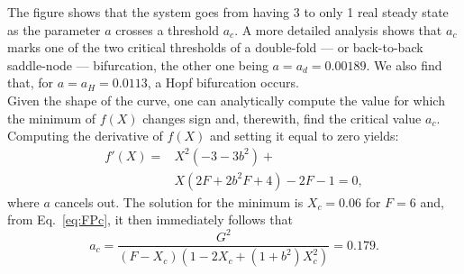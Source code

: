 \documentclass[%
 aip, cha,
 amsmath,amssymb,
 reprint,%
author-year,%
]{revtex4-1}
\newcommand{\0}{\mathbf 0}
\begin{document}
The figure shows that the system goes from having 3 to only 1 real steady state as the parameter $a$ crosses a threshold $a_c.$ 
A more detailed analysis shows that $a_c$ marks one of the two critical thresholds of a double-fold — or back-to-back saddle-node — bifurcation, the other one being $a = a_d = 0.00189$. We also find that, for $a = a_H=0.0113$, a Hopf bifurcation occurs. \\
Given the shape of the curve, one can analytically compute the value for which the minimum of $f(X)$ changes sign and, therewith, find the critical value $a_c$. Computing the derivative of $f(X)$ and setting it equal to zero yields:
\begin{equation}
\begin{split}
    f'(X) = &X^2(-3-3b^2) + \\
            &X(2F+2b^2F+4)-2F-1 = 0,
\end{split}
\label{der}
\end{equation}
where $a$ cancels out. The solution for the minimum is $X_c = 0.06$ for $F = 6$ and, from Eq.~\eqref{eq:FPc}, it then immediately follows that
\begin{equation} \label{eq:a_crit}
    a_c = \frac{G^2}{(F-X_c)(1-2X_c +(1+b^2)X_c^2)} = 0.179.
\end{equation}
\end{document}
